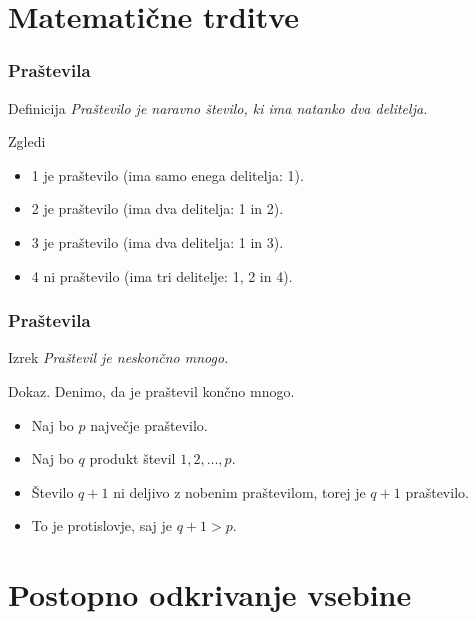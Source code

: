 \documentclass{beamer}
\begin{document}
\section{Matematične trditve}

\begin{frame}
   \frametitle{Praštevila}
   \begin{block}{Definicija}
      \emph{Praštevilo je naravno število, ki ima natanko dva delitelja.}
   \end{block}
   \begin{exampleblock}{Zgledi}
      \begin{itemize}
         \item 1 je praštevilo (ima samo enega delitelja: 1).
         \item 2 je praštevilo (ima dva delitelja: 1 in 2).
         \item 3 je praštevilo (ima dva delitelja: 1 in 3).
         \item 4 ni praštevilo (ima tri delitelje: 1, 2 in 4).
      \end{itemize}
   \end{exampleblock}
\end{frame}
\begin{frame}
   \frametitle{Praštevila}
   \begin{block}{Izrek}
      \emph{Praštevil je neskončno mnogo.}
   \end{block}
   \begin{block}{Dokaz.}
      Denimo, da je praštevil končno mnogo.
      \begin{itemize}
         \item Naj bo $p$ največje praštevilo.
         \item Naj bo $q$ produkt števil $1, 2, \dots , p$.
         \item Število $q+1$ ni deljivo z nobenim praštevilom, torej je $q+1$ praštevilo.
         \item To je protislovje, saj je $q+1>p$.
      \end{itemize}
   \end{block}
\end{frame}

\section{Postopno odkrivanje vsebine}
\end{document}
